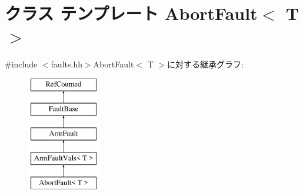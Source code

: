 \hypertarget{classArmISA_1_1AbortFault}{
\section{クラス テンプレート AbortFault$<$ T $>$}
\label{classArmISA_1_1AbortFault}
}


{\ttfamily \#include $<$faults.hh$>$}AbortFault$<$ T $>$に対する継承グラフ:\begin{figure}[H]
\begin{center}
\leavevmode
\includegraphics[height=5cm]{classArmISA_1_1AbortFault}
\end{center}
\end{figure}
